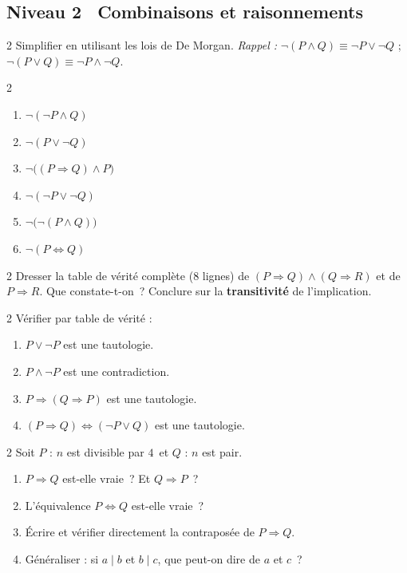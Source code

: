 \subsection*{\quad Niveau 2 \textemdash\ Combinaisons et raisonnements}

\begin{exo}{2}
Simplifier en utilisant les lois de De Morgan.
\emph{Rappel :} $\lnot(P \land Q) \equiv \lnot P \lor \lnot Q$ ;
$\lnot(P \lor Q) \equiv \lnot P \land \lnot Q$.
\begin{multicols}{2}
\begin{enumerate}
  \item $\lnot(\lnot P \land Q)$
  \item $\lnot(P \lor \lnot Q)$
  \item $\lnot\bigl((P \Rightarrow Q) \land P\bigr)$
  \item $\lnot(\lnot P \lor \lnot Q)$
  \item $\lnot\bigl(\lnot(P \land Q)\bigr)$
  \item $\lnot(P \Leftrightarrow Q)$
\end{enumerate}
\end{multicols}
\end{exo}

\begin{exo}{2}
Dresser la table de v\'erit\'e compl\`ete ($8$ lignes) de
$(P \Rightarrow Q) \land (Q \Rightarrow R)$ et de $P \Rightarrow R$.
Que constate-t-on~? Conclure sur la \textbf{transitivit\'e} de l'implication.
\end{exo}

\begin{exo}{2}
V\'erifier par table de v\'erit\'e :
\begin{enumerate}
  \item $P \lor \lnot P$ est une tautologie.
  \item $P \land \lnot P$ est une contradiction.
  \item $P \Rightarrow (Q \Rightarrow P)$ est une tautologie.
  \item $(P \Rightarrow Q) \Leftrightarrow (\lnot P \lor Q)$ est une tautologie.
\end{enumerate}
\end{exo}

\begin{exo}{2}
Soit $P$ : \og $n$ est divisible par $4$\fg\ et
$Q$ : \og $n$ est pair\fg.
\begin{enumerate}
  \item $P \Rightarrow Q$ est-elle vraie~? Et $Q \Rightarrow P$~?
  \item L'\'equivalence $P \Leftrightarrow Q$ est-elle vraie~?
  \item \'Ecrire et v\'erifier directement la contrapos\'ee de $P \Rightarrow Q$.
  \item G\'en\'eraliser : si $a \mid b$ et $b \mid c$, que peut-on dire de $a$ et $c$~?
\end{enumerate}
\end{exo}

